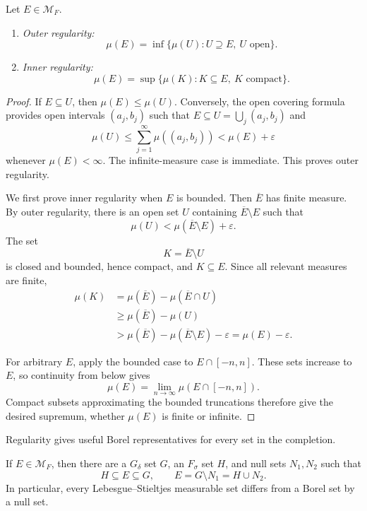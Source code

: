 \begin{theorem}[Regularity]
  \label{thm:lebesgue-stieltjes-regularity-sep-10}
  Let $E\in\mathcal M_F$.
  \begin{enumerate}[label=(\roman*)]
    \item \emph{Outer regularity:}
      \[
        \mu(E)=\inf\{\mu(U):U\supseteq E,\ U\text{ open}\}.
      \]
    \item \emph{Inner regularity:}
      \[
        \mu(E)=\sup\{\mu(K):K\subseteq E,\ K\text{ compact}\}.
      \]
  \end{enumerate}
\end{theorem}

\begin{proof}
  If $E\subseteq U$, then $\mu(E)\leq\mu(U)$. Conversely, the open
  covering formula provides open intervals $(a_j,b_j)$ such that
  $E\subseteq U=\bigcup_j(a_j,b_j)$ and
  \[
    \mu(U)
    \leq\sum_{j=1}^{\infty}\mu((a_j,b_j))
    <\mu(E)+\varepsilon
  \]
  whenever $\mu(E)<\infty$. The infinite-measure case is immediate.
  This proves outer regularity.

  We first prove inner regularity when $E$ is bounded. Then $\overline E$
  has finite measure. By outer regularity, there is an open set $U$
  containing $\overline E\setminus E$ such that
  \[
    \mu(U)<\mu(\overline E\setminus E)+\varepsilon.
  \]
  The set
  \[
    K=\overline E\setminus U
  \]
  is closed and bounded, hence compact, and $K\subseteq E$. Since all
  relevant measures are finite,
  \begin{align*}
    \mu(K)
    &=\mu(\overline E)-\mu(\overline E\cap U)\\
    &\geq\mu(\overline E)-\mu(U)\\
    &>\mu(\overline E)-\mu(\overline E\setminus E)-\varepsilon
      =\mu(E)-\varepsilon.
  \end{align*}

  For arbitrary $E$, apply the bounded case to
  $E\cap[-n,n]$. These sets increase to $E$, so continuity from below
  gives
  \[
    \mu(E)=\lim_{n\to\infty}\mu(E\cap[-n,n]).
  \]
  Compact subsets approximating the bounded truncations therefore give
  the desired supremum, whether $\mu(E)$ is finite or infinite.
\end{proof}

Regularity gives useful Borel representatives for every set in the
completion.

\begin{corollary}\label{cor:borel-null-representatives-sep-10}
  If $E\in\mathcal M_F$, then there are a $G_\delta$ set $G$, an
  $F_\sigma$ set $H$, and null sets $N_1,N_2$ such that
  \[
    H\subseteq E\subseteq G,
    \qquad
    E=G\setminus N_1=H\cup N_2.
  \]
  In particular, every Lebesgue--Stieltjes measurable set differs from
  a Borel set by a null set.
\end{corollary}

